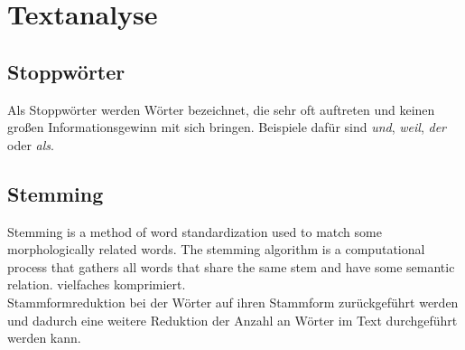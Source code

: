 \section{Textanalyse}
	\subsection{Stoppwörter}
	\label{sec:Stoppwörter}
	Als Stoppwörter werden Wörter bezeichnet, die sehr oft auftreten und keinen großen Informationsgewinn mit sich bringen. Beispiele dafür sind \textit{und}, \textit{weil}, \textit{der} oder \textit{als}.\cite{Stopwords} \\
	\subsection{Stemming}
	Stemming is a method of  word standardization used to match some morphologically related words. The stemming algorithm is a computational  process that gathers all words that share the same stem and have some semantic relation. \cite{eldesouki2009stemming}
	vielfaches komprimiert.\\
	Stammformreduktion bei der Wörter auf ihren Stammform zurückgeführt werden und dadurch eine weitere Reduktion der Anzahl an Wörter im Text durchgeführt werden kann.
